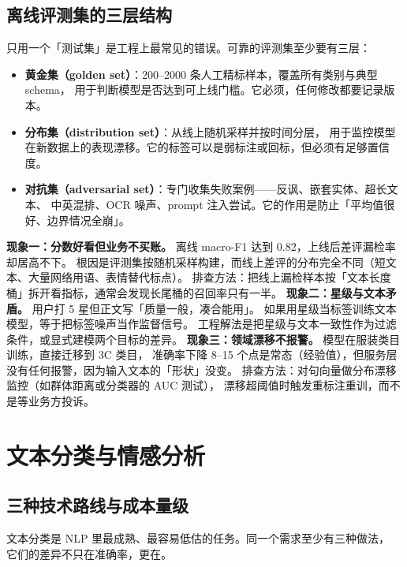 \subsection{离线评测集的三层结构}

只用一个「测试集」是工程上最常见的错误。可靠的评测集至少要有三层：

\begin{itemize}
  \item \textbf{黄金集（golden set）}：200--2000 条人工精标样本，覆盖所有类别与典型 schema，
        用于判断模型是否达到可上线门槛。它必须，任何修改都要记录版本。
  \item \textbf{分布集（distribution set）}：从线上随机采样并按时间分层，
        用于监控模型在新数据上的表现漂移。它的标签可以是弱标注或回标，但必须有足够置信度。
  \item \textbf{对抗集（adversarial set）}：专门收集失败案例——反讽、嵌套实体、超长文本、
        中英混排、OCR 噪声、prompt 注入尝试。它的作用是防止「平均值很好、边界情况全崩」。
\end{itemize}

\begin{pitfall}[情感分析里最贵的三个坑]
\textbf{现象一：分数好看但业务不买账。} 离线 macro-F1 达到 0.82，上线后差评漏检率却居高不下。
根因是评测集按随机采样构建，而线上差评的分布完全不同（短文本、大量网络用语、表情替代标点）。
排查方法：把线上漏检样本按「文本长度桶」拆开看指标，通常会发现长尾桶的召回率只有一半。
\textbf{现象二：星级与文本矛盾。} 用户打 5 星但正文写「质量一般，凑合能用」。
如果用星级当标签训练文本模型，等于把标签噪声当作监督信号。
工程解法是把星级与文本一致性作为过滤条件，或显式建模两个目标的差异。
\textbf{现象三：领域漂移不报警。} 模型在服装类目训练，直接迁移到 3C 类目，
准确率下降 8--15 个点是常态（经验值），但服务层没有任何报警，因为输入文本的「形状」没变。
排查方法：对句向量做分布漂移监控（如群体距离或分类器的 AUC 测试），
漂移超阈值时触发重标注重训，而不是等业务方投诉。
\end{pitfall}

\section{文本分类与情感分析}

\subsection{三种技术路线与成本量级}

文本分类是 NLP 里最成熟、最容易低估的任务。同一个需求至少有三种做法，
它们的差异不只在准确率，更在。

